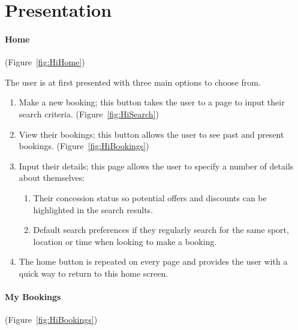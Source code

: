 \section{Presentation}
\label{sec:secondprotopresentation}

\paragraph{Home} (Figure~\ref{fig:HiHome})


The user is at first presented with three main options to choose from.
\begin{enumerate}
	\item Make a new booking; this button takes the user to a page to input
		their search criteria. (Figure~\ref{fig:HiSearch})
	\item View their bookings; this button allows the user to see past and
		present bookings. (Figure~\ref{fig:HiBookings})
	\item Input their details; this page allows the user to specify a number
		of details about themselves:

		\begin{enumerate}
			\item Their concession status so potential offers and
				discounts can be highlighted in the search results.
			\item Default search preferences if they regularly search for the
				same sport, location or time when looking to make a booking.
		\end{enumerate}
	\item The home button is repeated on every page and provides the user with
		a quick way to return to this home screen.
\end{enumerate}

\paragraph{My Bookings} (Figure~\ref{fig:HiBookings})


